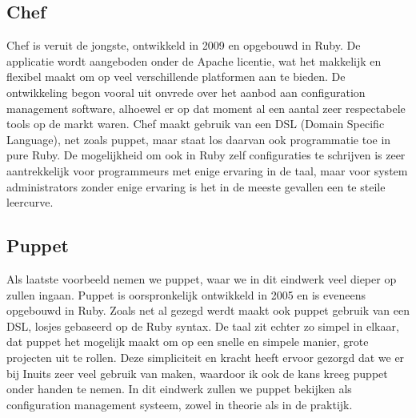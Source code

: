 \subsection{Chef}
Chef is veruit de jongste, ontwikkeld in 2009 en opgebouwd in Ruby. De applicatie wordt aangeboden onder de Apache licentie, wat het makkelijk en flexibel maakt om op veel verschillende platformen aan te bieden. De ontwikkeling begon vooral uit onvrede over het aanbod aan configuration management software, alhoewel er op dat moment al een aantal zeer respectabele tools op de markt waren. Chef maakt gebruik van een DSL (Domain Specific Language), net zoals puppet, maar staat los daarvan ook programmatie toe in pure Ruby. De mogelijkheid om ook in Ruby zelf configuraties te schrijven is zeer aantrekkelijk voor programmeurs met enige ervaring in de taal, maar voor system administrators zonder enige ervaring is het in de meeste gevallen een te steile leercurve.
%
\subsection{Puppet}
Als laatste voorbeeld nemen we puppet, waar we in dit eindwerk veel dieper op zullen ingaan. Puppet is oorspronkelijk ontwikkeld in 2005 en is eveneens opgebouwd in Ruby. Zoals net al gezegd werdt maakt ook puppet gebruik van een DSL, losjes gebaseerd op de Ruby syntax. De taal zit echter zo simpel in elkaar, dat puppet het mogelijk maakt om op een snelle en simpele manier, grote projecten uit te rollen. Deze simpliciteit en kracht heeft ervoor gezorgd dat we er bij Inuits zeer veel gebruik van maken, waardoor ik ook de kans kreeg puppet onder handen te nemen. In dit eindwerk zullen we puppet bekijken als configuration management systeem, zowel in theorie als in de praktijk.

